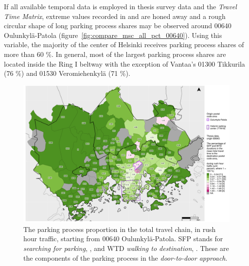 If all available temporal data is employed in thesis survey data and the \textit{Travel Time Matrix}, extreme values recorded in  and  are honed away and a rough circular shape of long parking process shares may be observed around 00640 Oulunkylä-Patola (figure~\ref{fig:compare_msc_all_pct_00640}). Using this variable, the majority of the center of Helsinki receives parking process shares of more than 60 \%. In general, most of the largest parking process shares are located inside the Ring I beltway with the exception of Vantaa's 01300 Tikkurila (76 \%) and 01530 Veromiehenkylä (71 \%).

\begin{figure}
    \centering
    \includegraphics[trim={0.9cm 0.3cm 0.25cm 0.3cm},clip,width=\textwidth]{images/compare_traveltimes_mapfill-msc_r_pct_fromzip-00640_28-09-2020.png}
    \caption[Parking process proportion from Oulunkylä-Patola, rush hour traffic]{The parking process proportion in the total travel chain, in rush hour traffic, starting from 00640 Oulunkylä-Patola. SFP stands for \textit{searching for parking}, , and WTD \textit{walking to destination}, . These are the components of the parking process in the \textit{door-to-door approach}.}%
    \label{fig:compare_msc_r_pct_00640}%
\end{figure}

